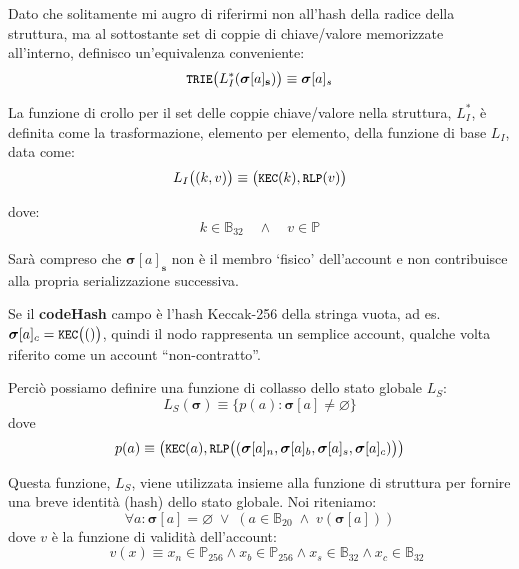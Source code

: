 \documentclass[9pt,oneside]{amsart}
\begin{document}
\begin{multicols}{2}
Dato che solitamente mi augro di riferirmi non all'hash della radice della struttura, ma al sottostante set di coppie di chiave/valore memorizzate all'interno, definisco un'equivalenza conveniente:
\begin{equation}
\texttt{\small TRIE}\big(L_I^*(\boldsymbol{\sigma}[a]_\mathbf{s})\big) \equiv \boldsymbol{\sigma}[a]_s
\end{equation}

La funzione di crollo per il set delle coppie chiave/valore nella struttura, $L_I^*$, è definita come la trasformazione, elemento per elemento, della funzione di base $L_I$, data come:
\begin{equation}
L_I\big( (k, v) \big) \equiv \big(\texttt{\small KEC}(k), \texttt{\small RLP}(v)\big)
\end{equation}

dove:
\begin{equation}
k \in \mathbb{B}_{32} \quad \wedge \quad v \in \mathbb{P}
\end{equation}

Sarà compreso che $\boldsymbol{\sigma}[a]_\mathbf{s}$ non è il membro `fisico' dell'account e non contribuisce alla propria serializzazione successiva.

Se il \textbf{codeHash} campo è l'hash Keccak-256 della stringa vuota, ad es. $\boldsymbol{\sigma}[a]_c = \texttt{\small KEC}\big(()\big)$, quindi il nodo rappresenta un semplice account, qualche volta riferito come un account ``non-contratto''.

Perciò possiamo definire una funzione di collasso dello stato globale $L_S$:
\begin{equation}
L_S(\boldsymbol{\sigma}) \equiv \{ p(a): \boldsymbol{\sigma}[a] \neq \varnothing \}
\end{equation}
dove
\begin{equation}
p(a) \equiv  \big(\texttt{\small KEC}(a), \texttt{\small RLP}\big( (\boldsymbol{\sigma}[a]_n, \boldsymbol{\sigma}[a]_b, \boldsymbol{\sigma}[a]_s, \boldsymbol{\sigma}[a]_c) \big) \big)
\end{equation}

Questa funzione, $L_S$, viene utilizzata insieme alla funzione di struttura per fornire una breve identità (hash) dello stato globale. Noi riteniamo:
\begin{equation}
\forall a: \boldsymbol{\sigma}[a] = \varnothing \; \vee \; (a \in \mathbb{B}_{20} \; \wedge \; v(\boldsymbol{\sigma}[a]))
\end{equation}
dove $v$ è la funzione di validità dell'account:
\begin{equation}
\quad v(x) \equiv x_n \in \mathbb{P}_{256} \wedge x_b \in \mathbb{P}_{256} \wedge x_s \in \mathbb{B}_{32} \wedge x_c \in \mathbb{B}_{32}
\end{equation}


\end{multicols}
\end{document}
